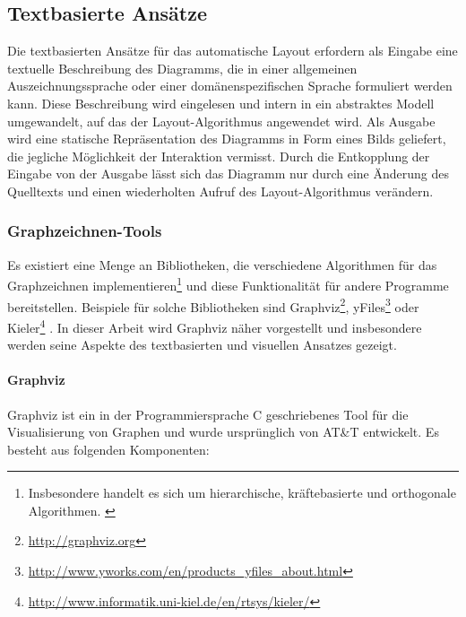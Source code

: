 
\subsection{Textbasierte Ansätze}
\label{subsec:text-based-approaches}

Die textbasierten Ansätze für das automatische Layout erfordern als Eingabe eine textuelle Beschreibung des Diagramms, die in einer allgemeinen Auszeichnungssprache oder einer domänenspezifischen Sprache formuliert werden kann. Diese Beschreibung wird eingelesen und intern in ein abstraktes Modell umgewandelt, auf das der Layout-Algorithmus angewendet wird. Als Ausgabe wird eine statische Repräsentation des Diagramms in Form eines Bilds geliefert, die jegliche Möglichkeit der Interaktion vermisst. Durch die Entkopplung der Eingabe von der Ausgabe lässt sich das Diagramm nur durch eine Änderung des Quelltexts und einen wiederholten Aufruf des Layout-Algorithmus verändern.

\subsubsection{Graphzeichnen-Tools}
\label{subsubsec:graph-drawing-tools}

Es existiert eine Menge an Bibliotheken, die verschiedene Algorithmen für das Graphzeichnen implementieren\footnote{Insbesondere handelt es sich um hierarchische, kräftebasierte und orthogonale Algorithmen. \cite{Maier12A-Pattern-based}} und diese Funktionalität für andere Programme bereitstellen. Beispiele für solche Bibliotheken sind Graphviz\footnote{\url{http://graphviz.org}}, yFiles\footnote{\url{http://www.yworks.com/en/products_yfiles_about.html}} oder Kieler\footnote{\url{http://www.informatik.uni-kiel.de/en/rtsys/kieler/}} \cite{Maier12A-Pattern-based}. In dieser Arbeit wird Graphviz näher vorgestellt und insbesondere werden seine Aspekte des textbasierten und visuellen Ansatzes gezeigt.

\paragraph{Graphviz}

Graphviz ist ein in der Programmiersprache C geschriebenes Tool für die Visualisierung von Graphen und wurde ursprünglich von AT\&T entwickelt. Es besteht aus folgenden Komponenten:

